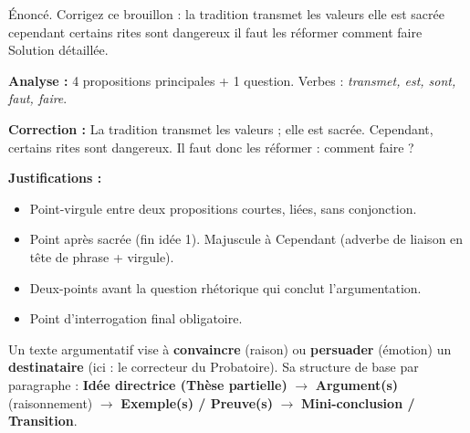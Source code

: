 \documentclass[11pt]{article}
\begin{document}
\begin{exoresolu}
Énoncé. Corrigez ce brouillon : \og la tradition transmet les valeurs elle est sacrée cependant certains rites sont dangereux il faut les réformer comment faire \fg
\tcblower
Solution détaillée.

\textbf{Analyse :} 4 propositions principales + 1 question. Verbes : \emph{transmet, est, sont, faut, faire}.

\textbf{Correction :}
\og La tradition transmet les valeurs ; elle est sacrée. Cependant, certains rites sont dangereux. Il faut donc les réformer : comment faire ? \fg

\textbf{Justifications :}
\begin{itemize}
\item Point-virgule entre deux propositions courtes, liées, sans conjonction.
\item Point après \og sacrée \fg (fin idée 1). Majuscule à \og Cependant \fg (adverbe de liaison en tête de phrase + virgule).
\item Deux-points avant la question rhétorique qui conclut l'argumentation.
\item Point d'interrogation final obligatoire.
\end{itemize}
\end{exoresolu}

\begin{definition}
Un texte argumentatif vise à \textbf{convaincre} (raison) ou \textbf{persuader} (émotion) un \textbf{destinataire} (ici : le correcteur du Probatoire). Sa structure de base par paragraphe :
\textbf{Idée directrice (Thèse partielle)} $\rightarrow$ \textbf{Argument(s)} (raisonnement) $\rightarrow$ \textbf{Exemple(s) / Preuve(s)} $\rightarrow$ \textbf{Mini-conclusion / Transition}.
\end{definition}
\end{document}
